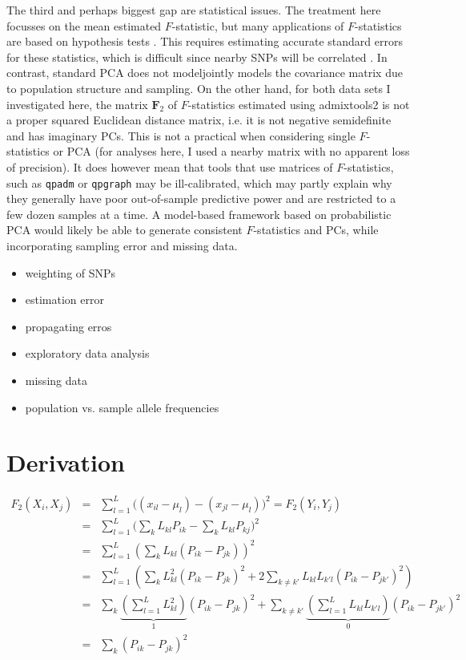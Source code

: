\documentclass[12pt,a4pape, fullpage]{article}
\newcommand{\MF}{\mathbf{F}_2} %
\begin{document}
The third and perhaps biggest gap are statistical issues. The treatment here focusses on the mean estimated $F$-statistic, but many  applications of $F$-statistics are based on hypothesis tests \cite{patterson2012}. This requires estimating accurate standard errors for these statistics, which is difficult since nearby SNPs will be correlated \cite{hahn2019}. In contrast, standard PCA does not modeljointly models the covariance matrix due to population structure and sampling. On the other hand, for both data sets I investigated here, the matrix $\MF$ of $F$-statistics estimated using admixtools2 is not a proper squared Euclidean distance matrix, i.e. it is not negative semidefinite and has imaginary PCs. This is not a practical when considering single $F$-statistics or PCA (for analyses here, I used a nearby matrix  \citep{higham2002} with no apparent loss of precision). It does however mean that tools that use matrices of $F$-statistics, such as \texttt{qpadm} or \texttt{qpgraph} may be ill-calibrated, which may partly explain why they generally have poor out-of-sample predictive power and are restricted to a few dozen samples at a time. A model-based framework based on probabilistic PCA \citep{meisner2021, agrawal2020, softimpute} would likely be able to generate consistent $F$-statistics and PCs, while incorporating sampling error and missing data.

\begin{itemize}
    \item weighting of SNPs
    \item estimation error
    \item propagating erros
    \item exploratory data analysis
    \item missing data
    \item population vs. sample allele frequencies
\end{itemize}

\appendix
\section{Derivation}\label{appendix:fonpc}
\begin{eqnarray}
F_2(X_i, X_j) &=& \sum_{l=1}^L \big( (x_{il} - \mu_l) -(x_{jl} -\mu_l)\big)^2 = F_2(Y_i, Y_j)\nonumber\\
&=& \sum_{l=1}^L \big( \sum_k L_{kl}P_{ik} - \sum_kL_{kl}P_{kj}\big)^2\nonumber\\
&=& \sum_{l=1}^L \left( \sum_k L_{kl} (P_{ik} -P_{jk}) \right)^2\nonumber\\
&=& \sum_{l=1}^L \left( \sum_k L_{kl}^2 (P_{ik} -P_{jk})^2 + 2\sum_{k\neq k'} L_{kl}L_{k'l}(P_{ik} - P_{jk'})^2 \right)\nonumber\\
&=& \sum_k \underbrace{\left(\sum_{l=1}^L L_{kl}^2\right)}_1 (P_{ik} -P_{jk})^2 + \sum_{k\neq k'}\underbrace{\left(\sum_{l=1}^L L_{kl}L_{k'l}\right)}_{0} (P_{ik} - P_{jk'})^2\nonumber\\
&=& \sum_k (P_{ik} - P_{jk})^2
\end{eqnarray}
\end{document}
